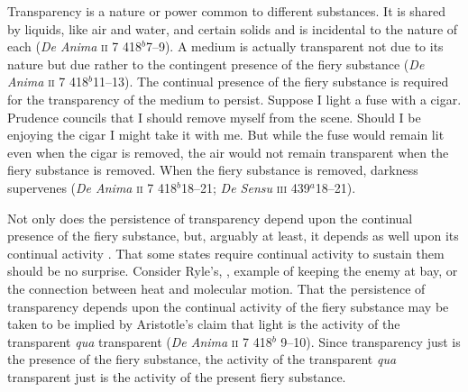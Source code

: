 Transparency is a nature or power common to different substances. It is shared by liquids, like air and water, and certain solids and is incidental to the nature of each (\emph{De Anima} \textsc{ii} 7 418\( ^{b} \)7--9). A medium is actually transparent not due to its nature but due rather to the contingent presence of the fiery substance (\emph{De Anima} \textsc{ii} 7 418\( ^{b} \)11--13). The continual presence of the fiery substance is required for the transparency of the medium to persist. Suppose I light a fuse with a cigar. Prudence councils that I should remove myself from the scene. Should I be enjoying the cigar I might take it with me. But while the fuse would remain lit even when the cigar is removed, the air would not remain transparent when the fiery substance is removed. When the fiery substance is removed, darkness supervenes (\emph{De Anima} \textsc{ii} 7 418\( ^{b} \)18--21; \emph{De Sensu} \textsc{iii} 439\( ^{a} \)18--21). 

Not only does the persistence of transparency depend upon the continual presence of the fiery substance, but, arguably at least, it depends as well upon its continual activity \citep[\emph{pace}][424]{Burnyeat:1995fk}. That some states require continual activity to sustain them should be no surprise. Consider Ryle's, \citeyearpar[149]{Ryle:1949qr}, example of keeping the enemy at bay, or the connection between heat and molecular motion. That the persistence of transparency depends upon the continual activity of the fiery substance may be taken to be implied by Aristotle's claim that light is the activity of the transparent \emph{qua} transparent (\emph{De Anima} \textsc{ii} 7 418\( ^{b} \) 9--10). Since transparency just is the presence of the fiery substance, the activity of the transparent \emph{qua} transparent just is the activity of the present fiery substance. 

